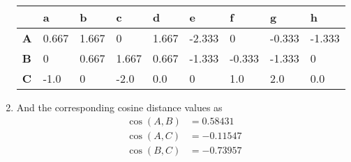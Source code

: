 \begin{enumerate}[label=(\alph*)]
    \begin{table}[!htb]
        \centering
        \begin{tabular}{lllllllll}
        \hline
                   & \textbf{a} & \textbf{b} & \textbf{c} & \textbf{d} & \textbf{e} & \textbf{f} & \textbf{g} & \textbf{h} \\ \hline
        \textbf{A} & 0.667      & 1.667      & 0          & 1.667      & -2.333     & 0          & -0.333     & -1.333     \\
        \textbf{B} & 0          & 0.667      & 1.667      & 0.667      & -1.333     & -0.333     & -1.333     & 0          \\
        \textbf{C} & -1.0       & 0          & -2.0       & 0.0        & 0          & 1.0        & 2.0        & 0.0        \\ \hline
        \end{tabular}
    \end{table}

    \item And the corresponding cosine distance values as
    \begin{align*}
        \cos(A,B) &= 0.58431\\
        \cos(A,C) &= -0.11547 \\
        \cos(B,C) &= -0.73957
    \end{align*}
    
\end{enumerate}